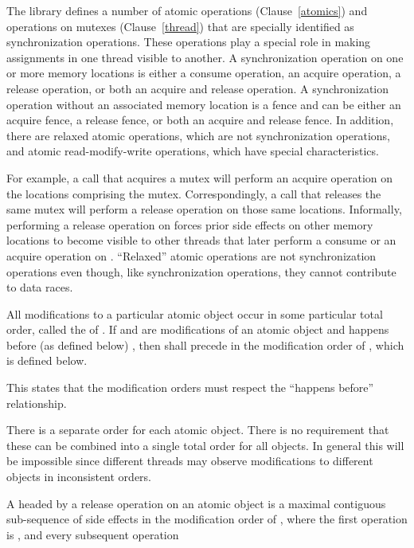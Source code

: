 \pnum
The library defines a number of atomic operations (Clause~\ref{atomics}) and
operations on mutexes (Clause~\ref{thread}) that are specially identified as
synchronization operations. These operations play a special role in making
assignments in one thread visible to another. A synchronization operation on one
or more memory locations is either a consume operation, an acquire operation, a
release operation, or both an acquire and release operation. A synchronization
operation without an associated memory location is a fence and can be either an
acquire fence, a release fence, or both an acquire and release fence. In
addition, there are relaxed atomic operations, which are not synchronization
operations, and atomic read-modify-write operations, which have special
characteristics. \begin{note} For example, a call that acquires a mutex will
perform an acquire operation on the locations comprising the mutex.
Correspondingly, a call that releases the same mutex will perform a release
operation on those same locations. Informally, performing a release operation on
 forces prior
%
side effects on other memory locations to become visible
to other threads that later perform a consume or an acquire operation on
. ``Relaxed'' atomic operations are not synchronization operations even
though, like synchronization operations, they cannot contribute to data races.
\end{note}

\pnum
All modifications to a particular atomic object  occur in some
particular total order, called the  of . If
 and  are modifications of an atomic object  and
 happens before (as defined below) , then  shall precede
 in the modification order of , which is defined below.
\begin{note} This states that the modification orders must respect the ``happens
before'' relationship. \end{note} \begin{note} There is a separate order for each
atomic object. There is no requirement that these can be combined into a single
total order for all objects. In general this will be impossible since different
threads may observe modifications to different objects in inconsistent orders.
\end{note}

\pnum
A  headed by a release operation  on an atomic object
 is a maximal contiguous sub-sequence of
%
side effects in the
modification order of , where the first operation is , and
every subsequent operation

